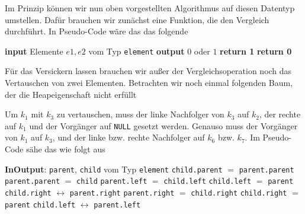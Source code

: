 \documentclass[tikz,12pt]{article}
\begin{document}
Im Prinzip können wir nun oben vorgestellten Algorithmus auf diesen Datentyp umstellen.
Dafür brauchen wir zunächst eine Funktion, die den Vergleich durchführt. 
In Pseudo-Code wäre das das folgende
\begin{algorithmic}[1]
  \State\textbf{input} Elemente $e1, e2$ vom Typ \texttt{element}
  \State \textbf{output} $0$ oder $1$
  \State \textbf{return 1}
  \Else
  \State \textbf{return 0}
  \EndIf
  \EndProcedure
\end{algorithmic}
Für das Versickern lassen brauchen wir außer der Vergleichsoperation noch das Vertauschen von zwei Elementen. 
Betrachten wir noch einmal folgenden Baum, der die Heapeigenschaft nicht erfüllt
\begin{center}
\end{center}
Um $k_1$ mit $k_3$ zu vertauschen, muss der linke Nachfolger von $k_3$ auf $k_2$, der rechte auf $k_1$ und der Vorgänger auf \texttt{NULL} gesetzt werden.
Genauso muss der Vorgänger von $k_1$ auf $k_3$, und der linke bzw. rechte Nachfolger auf $k_6$ bzw. $k_7$. 
Im Pseudo-Code sähe das wie folgt aus
\begin{algorithmic}[1]
  \State\textbf{InOutput}: \texttt{parent}, \texttt{child} vom Typ \texttt{element}
  \State \texttt{child.parent} $=$ \texttt{parent.parent}
  \State \texttt{parent.parent} $=$ \texttt{child}
  \State \texttt{parent.left} $=$ \texttt{child.left}
  \State \texttt{child.left} $=$ \texttt{parent}
  \State \texttt{child.right} $\leftrightarrow$ \texttt{parent.right}
  \Else
  \State \texttt{parent.right} $=$ \texttt{child.right}
  \State \texttt{child.right} $=$ \texttt{parent}
  \State \texttt{child.left} $\leftrightarrow$ \texttt{parent.left}
  \EndIf
  \EndProcedure
\end{algorithmic}
\end{document}
